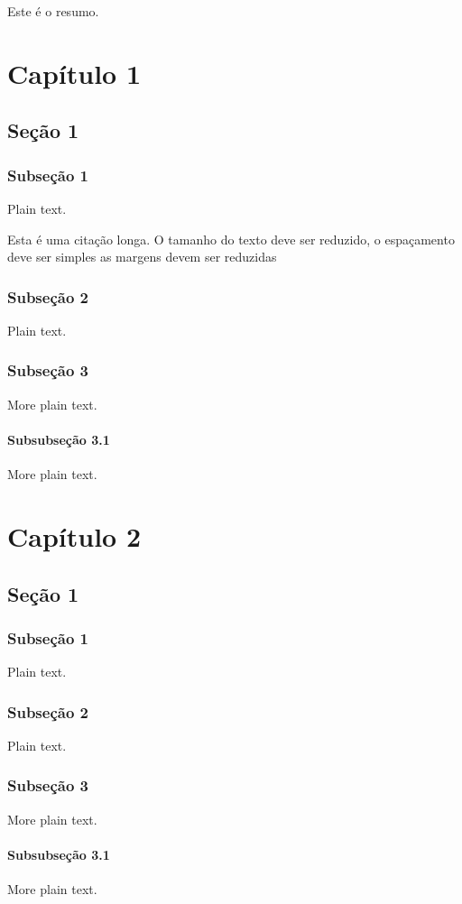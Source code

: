 \documentclass{abntex2}
\begin{document}
\begin{resumo}
Este é o resumo.
\end{resumo}

\chapter{Capítulo 1}

\section{Seção 1}

\subsection{Subseção 1}

Plain text.

\begin{citacao}
Esta é uma citação longa. O tamanho do texto deve ser reduzido, o espaçamento
deve ser simples as margens devem ser reduzidas
\end{citacao}

\subsection{Subseção 2}

Plain text.

\subsection{Subseção 3}

More plain text.

\subsubsection{Subsubseção 3.1}

More plain text.



\chapter{Capítulo 2}

\section{Seção 1}

\subsection{Subseção 1}

Plain text.

\subsection{Subseção 2}

Plain text.

\subsection{Subseção 3}

More plain text.

\subsubsection{Subsubseção 3.1}

More plain text.
\end{document}
